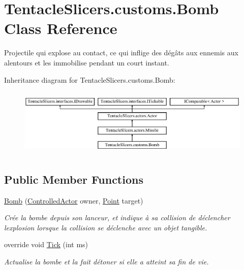 \hypertarget{class_tentacle_slicers_1_1customs_1_1_bomb}{}\section{Tentacle\+Slicers.\+customs.\+Bomb Class Reference}
\label{class_tentacle_slicers_1_1customs_1_1_bomb}


Projectile qui explose au contact, ce qui inflige des dégâts aux ennemis aux alentours et les immobilise pendant un court instant.  


Inheritance diagram for Tentacle\+Slicers.\+customs.\+Bomb\+:\begin{figure}[H]
\begin{center}
\leavevmode
\includegraphics[height=3.274854cm]{class_tentacle_slicers_1_1customs_1_1_bomb}
\end{center}
\end{figure}
\subsection*{Public Member Functions}
\begin{DoxyCompactItemize}
\item 
\hyperlink{class_tentacle_slicers_1_1customs_1_1_bomb_a0b4e34b54ffd0005636cd79faad018aa}{Bomb} (\hyperlink{class_tentacle_slicers_1_1actors_1_1_controlled_actor}{Controlled\+Actor} owner, \hyperlink{class_tentacle_slicers_1_1general_1_1_point}{Point} target)
\begin{DoxyCompactList}\small\item\em Crée la bombe depuis son lanceur, et indique à sa collision de déclencher l\textquotesingle{}explosion lorsque la collision se déclenche avec un objet tangible. \end{DoxyCompactList}\item 
override void \hyperlink{class_tentacle_slicers_1_1customs_1_1_bomb_aefe2c2dcf1c3159e161f781c4d0d08d7}{Tick} (int ms)
\begin{DoxyCompactList}\small\item\em Actualise la bombe et la fait détoner si elle a atteint sa fin de vie. \end{DoxyCompactList}\end{DoxyCompactItemize}

